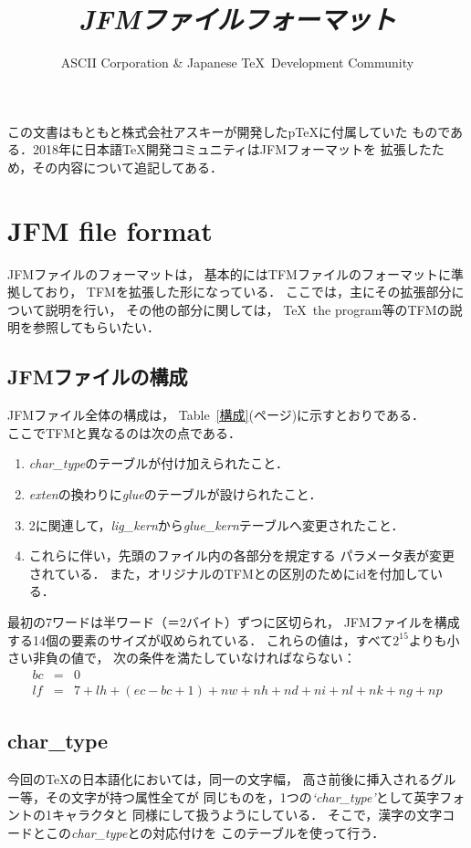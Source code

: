 \documentclass[a4paper,11pt,nomag]{jsarticle}
\title{\emph{JFMファイルフォーマット}}
\author{ASCII Corporation \& Japanese \TeX\ Development Community}
\begin{document}
\maketitle

この文書はもともと株式会社アスキーが開発したp\TeX{}に付属していた
ものである．2018年に日本語\TeX{}開発コミュニティはJFMフォーマットを
拡張したため，その内容について追記してある．

\section{JFM file format}
JFMファイルのフォーマットは，
基本的にはTFMファイルのフォーマットに準拠しており，
TFMを拡張した形になっている．
ここでは，主にその拡張部分について説明を行い，
その他の部分に関しては，
\TeX\ the program等のTFMの説明を参照してもらいたい．

\subsection{JFMファイルの構成}
JFMファイル全体の構成は，
Table~\ref{構成}(\pageref{構成}ページ)に示すとおりである． \\
ここでTFMと異なるのは次の点である．
\begin{enumerate}
\item {\it char\_type}のテーブルが付け加えられたこと．
\item {\it exten}の換わりに{\it glue}のテーブルが設けられたこと．
\item 2に関連して，{\it lig\_kern}から{\it glue\_kern}テーブルへ変更されたこと．
\item これらに伴い，先頭のファイル内の各部分を規定する
	パラメータ表が変更されている．
	また，オリジナルのTFMとの区別のためにidを付加している．
\end{enumerate}
最初の7ワードは半ワード（＝2バイト）ずつに区切られ，
JFMファイルを構成する14個の要素のサイズが収められている．
これらの値は，すべて$2^{15}$よりも小さい非負の値で，
次の条件を満たしていなければならない：
\begin{eqnarray*}
bc &=& 0 \\
lf &=& 7 + lh + (ec - bc + 1) + nw + nh + nd + ni + nl + nk + ng + np
\end{eqnarray*}

\subsection{char\_type}
今回の\TeX の日本語化においては，同一の文字幅，
高さ前後に挿入されるグルー等，その文字が持つ属性全てが
同じものを，1つの{\it `char\_type'}として英字フォントの1キャラクタと
同様にして扱うようにしている．
そこで，漢字の文字コードとこの{\it char\_type}との対応付けを
このテーブルを使って行う．
\end{document}
